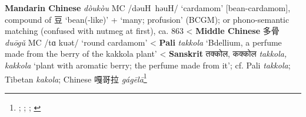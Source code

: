 \begin{etymology}\label{ety:doukou}
\textbf{Mandarin Chinese} {} \textit{dòukòu} MC /dəuH həuH/ `cardamom' [bean-cardamom], compound of 豆 `bean(-like)' +  `many; profusion' (BCGM); or phono-semantic matching (confused with nutmeg at first), ca. 863
< \textbf{Middle Chinese} {多骨} \textit{duōgǔ} MC /tɑ kuət/ `round cardamom'
< \textbf{Pali} \textit{takkola} `Bdellium, a perfume made from the berry of the kakkola plant'
< \textbf{Sanskrit} {तक्कोल, कक्कोल} \textit{takkola, kakkola} `plant with aromatic berry; the perfume made from it'; cf. Pali \textit{takkola}; Tibetan  \textit{kakola}; Chinese 嘎哥拉 \textit{gágēlā}\footnote{\textcite[22]{donkin_between_2003}; \textcite[18:55]{yyzz}; \textcite[292]{pali_text_society_pali_1921}; \textcite[431, 241]{monier-williams_sanskrit-english_1899}}
\end{etymology}